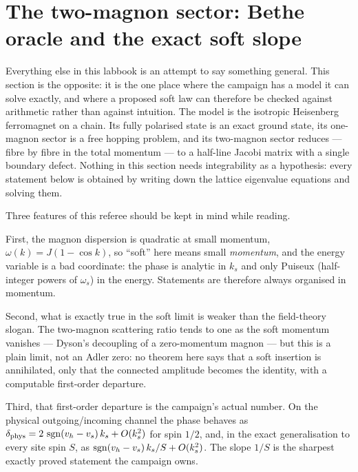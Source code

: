 
\section{The two-magnon sector: Bethe oracle and the exact soft slope}
\label{sec:two-magnon}

Everything else in this labbook is an attempt to say something general. This
section is the opposite: it is the one place where the campaign has a model it
can solve exactly, and where a proposed soft law can therefore be checked
against arithmetic rather than against intuition. The model is the isotropic
Heisenberg ferromagnet on a chain. Its fully polarised state is an exact
ground state, its one-magnon sector is a free hopping problem, and its
two-magnon sector reduces --- fibre by fibre in the total momentum --- to a
half-line Jacobi matrix with a single boundary defect. Nothing in this section
needs integrability as a hypothesis: every statement below is obtained by
writing down the lattice eigenvalue equations and solving them.

Three features of this referee should be kept in mind while reading.

First, the magnon dispersion is quadratic at small momentum,
$\omega(k)=J(1-\cos k)$, so ``soft'' here means small \emph{momentum}, and the
energy variable is a bad coordinate: the phase is analytic in $k_s$ and only
Puiseux (half-integer powers of $\omega_s$) in the energy. Statements are
therefore always organised in momentum.

Second, what is exactly true in the soft limit is weaker than the field-theory
slogan. The two-magnon scattering ratio tends to one as the soft momentum
vanishes --- Dyson's decoupling of a zero-momentum magnon --- but this is a
plain limit, not an Adler zero: no theorem here says that a soft insertion is
annihilated, only that the connected amplitude becomes the identity, with a
computable first-order departure.

Third, that first-order departure is the campaign's actual number. On the
physical outgoing/incoming channel the phase behaves as
$\delta_{\mathrm{phys}}=2\,\operatorname{sgn}(v_h-v_s)\,k_s+O(k_s^2)$ for spin $1/2$, and,
in the exact generalisation to every site spin $S$, as
$\operatorname{sgn}(v_h-v_s)\,k_s/S+O(k_s^2)$. The slope $1/S$ is the sharpest exactly
proved statement the campaign owns.

